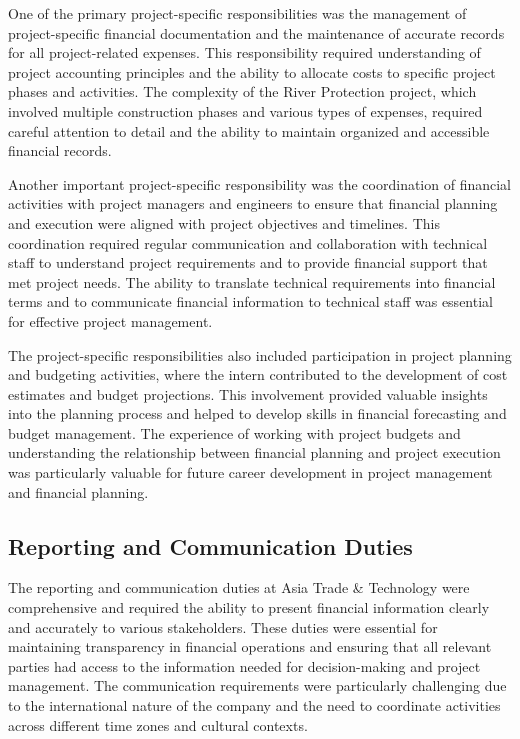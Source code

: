 One of the primary project-specific responsibilities was the management of project-specific financial documentation and the maintenance of accurate records for all project-related expenses. This responsibility required understanding of project accounting principles and the ability to allocate costs to specific project phases and activities. The complexity of the River Protection project, which involved multiple construction phases and various types of expenses, required careful attention to detail and the ability to maintain organized and accessible financial records.

Another important project-specific responsibility was the coordination of financial activities with project managers and engineers to ensure that financial planning and execution were aligned with project objectives and timelines. This coordination required regular communication and collaboration with technical staff to understand project requirements and to provide financial support that met project needs. The ability to translate technical requirements into financial terms and to communicate financial information to technical staff was essential for effective project management.

The project-specific responsibilities also included participation in project planning and budgeting activities, where the intern contributed to the development of cost estimates and budget projections. This involvement provided valuable insights into the planning process and helped to develop skills in financial forecasting and budget management. The experience of working with project budgets and understanding the relationship between financial planning and project execution was particularly valuable for future career development in project management and financial planning.

\subsection{Reporting and Communication Duties}
The reporting and communication duties at Asia Trade \& Technology were comprehensive and required the ability to present financial information clearly and accurately to various stakeholders. These duties were essential for maintaining transparency in financial operations and ensuring that all relevant parties had access to the information needed for decision-making and project management. The communication requirements were particularly challenging due to the international nature of the company and the need to coordinate activities across different time zones and cultural contexts.

